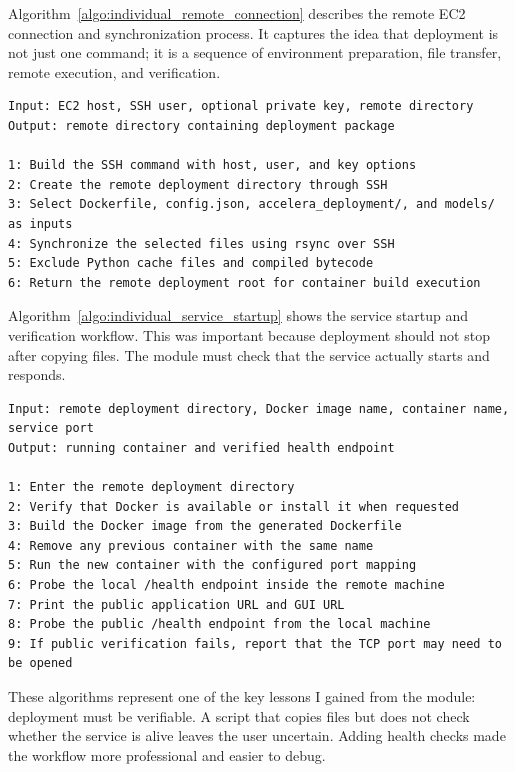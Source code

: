 \documentclass[12pt,a4paper,oneside]{report}
\begin{document}
Algorithm~\ref{algo:individual_remote_connection} describes the remote EC2 connection and synchronization process. It captures the idea that deployment is not just one command; it is a sequence of environment preparation, file transfer, remote execution, and verification.

\begin{lstlisting}[style=algostyle,caption={Remote Server Connection and Synchronization},label={algo:individual_remote_connection}]
Input: EC2 host, SSH user, optional private key, remote directory
Output: remote directory containing deployment package

1: Build the SSH command with host, user, and key options
2: Create the remote deployment directory through SSH
3: Select Dockerfile, config.json, accelera_deployment/, and models/ as inputs
4: Synchronize the selected files using rsync over SSH
5: Exclude Python cache files and compiled bytecode
6: Return the remote deployment root for container build execution
\end{lstlisting}

Algorithm~\ref{algo:individual_service_startup} shows the service startup and verification workflow. This was important because deployment should not stop after copying files. The module must check that the service actually starts and responds.

\begin{lstlisting}[style=algostyle,caption={Service Startup and Verification},label={algo:individual_service_startup}]
Input: remote deployment directory, Docker image name, container name, service port
Output: running container and verified health endpoint

1: Enter the remote deployment directory
2: Verify that Docker is available or install it when requested
3: Build the Docker image from the generated Dockerfile
4: Remove any previous container with the same name
5: Run the new container with the configured port mapping
6: Probe the local /health endpoint inside the remote machine
7: Print the public application URL and GUI URL
8: Probe the public /health endpoint from the local machine
9: If public verification fails, report that the TCP port may need to be opened
\end{lstlisting}

These algorithms represent one of the key lessons I gained from the module: deployment must be verifiable. A script that copies files but does not check whether the service is alive leaves the user uncertain. Adding health checks made the workflow more professional and easier to debug.
\end{document}
